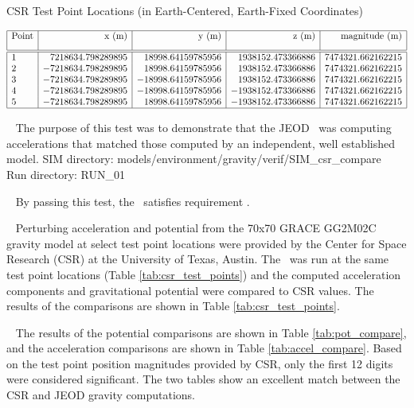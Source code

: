 \clearpage


\label{test:csr_grace}
\begin{description}

\begin{table}[htbp]\caption{CSR Test Point Locations (in Earth-Centered, Earth-Fixed
Coordinates)} \label{tab:csr_test_points}
\smallskip
\[ \begin{array}{| l | r | r | r | r |}\hline
\mbox{Point} & \mbox{x (m)} & \mbox{y (m)} & \mbox{z (m)} & \mbox{magnitude (m)}
\\*[0.3cm]\hline \hline
1 &  7218634.798289895 &  18998.64159785956 &  1938152.473366886 & 7474321.662162215 \\
2 & -7218634.798289895 &  18998.64159785956 &  1938152.473366886 & 7474321.662162215 \\
3 & -7218634.798289895 & -18998.64159785956 &  1938152.473366886 & 7474321.662162215 \\
4 & -7218634.798289895 & -18998.64159785956 & -1938152.473366886 & 7474321.662162215 \\
5 & -7218634.798289895 &  18998.64159785956 & -1938152.473366886 & 7474321.662162215\\
\hline
\end{array} \]
\end{table}

\item[Purpose:] \ \newline
The purpose of this test was to demonstrate that the JEOD \ModelDesc\ was
computing accelerations that matched those computed by an independent, well
established model.
SIM directory: models/environment/gravity/verif/SIM\_csr\_compare\\
Run directory: RUN\_01
\item[Applicable Requirements:] \ \newline
By passing this test, the \ModelDesc\ satisfies requirement
.
\item[Procedure:]\ \newline
Perturbing acceleration and potential from the 70x70 GRACE GG2M02C gravity model
at select test point locations were provided by the Center for Space
Research (CSR) at the University of Texas, Austin.  The \ModelDesc\ was run at
the same test point locations (Table \ref{tab:csr_test_points}) and the computed
acceleration components and gravitational potential were compared to CSR values.
The results of the comparisons are shown in Table \ref{tab:csr_test_points}.
\item[Results:]\ \newline
The results of the potential comparisons are shown in
Table \ref{tab:pot_compare}, and the acceleration comparisons are shown in
Table \ref{tab:accel_compare}.  Based on the test point position magnitudes
provided by CSR, only the first 12 digits were considered significant.  The
two tables show an excellent match between the CSR and JEOD gravity computations.


\end{description}
